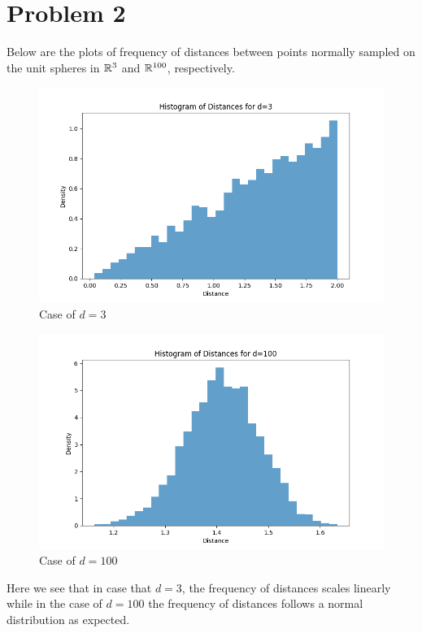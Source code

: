 \documentclass[12pt]{report}
\begin{document}
\section*{Problem 2}
Below are the plots of frequency of distances between points normally sampled on the unit spheres in $\mathbb{R}^3$ and $\mathbb{R}^{100}$, respectively.
\begin{figure}[H]
    \centering
    \includegraphics[scale=0.6]{CSE_382M/ps_1/dist_d_3.png}
    \caption{Case of $d = 3$}
    \label{fig:enter-label}
\end{figure}
\begin{figure}[H]
    \centering
    \includegraphics[scale=0.6]{CSE_382M/ps_1/dist_d_100.png}
    \caption{Case of $d=100$}
    \label{fig:enter-label}
\end{figure}
Here we see that in case that $d = 3$, the frequency of distances scales linearly while in the case of $d =100$ the frequency of distances follows a normal distribution as expected.
\end{document}
